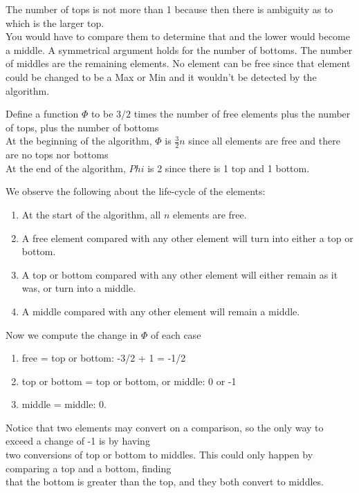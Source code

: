 \documentclass[11pt]{article}
\begin{document}
The number of tops is not more than 1 because then there is ambiguity as to which is the larger top.\\
You would have to compare them to determine that and the lower would become a middle. A symmetrical argument
holds for the number of bottoms. The number of middles are the remaining elements. No element can be free
since that element could be changed to be a Max or Min and it wouldn't be detected by the algorithm.

Define a function $\Phi$ to be $3/2$ times the number of free elements plus the number of tops, plus the number of bottoms\\
At the beginning of the algorithm, $\Phi$ is $\frac{3}{2} n$ since all elements are free and there are no tops nor bottoms\\
At the end of the algorithm, $Phi$ is 2 since there is 1 top and 1 bottom.

We observe the following about the life-cycle of the elements:

\begin{enumerate}
\item At the start of the algorithm, all $n$ elements are free.
\item A free element compared with any other element will turn into either a top or bottom.
\item A top or bottom compared with any other element will either remain as it was, or turn into a middle.
\item A middle compared with any other element will remain a middle.
\end{enumerate}

Now we compute the change in $\Phi$ of each case

\begin{enumerate}
\item free =\> top or bottom: -3/2 + 1 = -1/2
\item top or bottom =\> top or bottom, or middle: 0 or -1
\item middle =\> middle: 0.
\end{enumerate}

Notice that two elements may convert on a comparison, so the only way to exceed a change of -1 is by having\\
two conversions of top or bottom to middles. This could only happen by comparing a top and a bottom, finding\\
that the bottom is greater than the top, and they both convert to middles.
\end{document}
